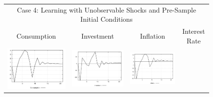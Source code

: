 \begin{figure}
\begin{tabular}{cccc}
\multicolumn{4}{c}{Case 4: Learning with Unobservable Shocks and Pre-Sample Initial Conditions}\\
Consumption & Investment & Inflation & Interest Rate \\ 
\includegraphics[scale=0.22]{results_wlsinit/Consumption_mpshock_irf.png} & 
\includegraphics[scale=0.22]{results_wlsinit/Investment_mpshock_irf.png} & 
\includegraphics[scale=0.22]{results_wlsinit/Inflation_mpshock_irf.png} & 

\end{tabular}
\end{figure}
